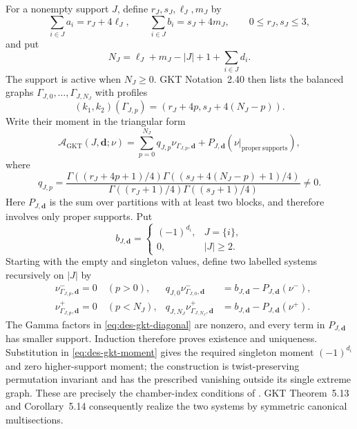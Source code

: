 For a nonempty support $J$, define $r_J,s_J,\ell_J,m_J$ by
\[
 \sum_{i\in J}a_i=r_J+4\ell_J,\qquad
 \sum_{i\in J}b_i=s_J+4m_J,\qquad 0\leq r_J,s_J\leq3,
\]
and put
\begin{equation}
 N_J=\ell_J+m_J-|J|+1+\sum_{i\in J}d_i.
 \label{eq:des-balanced-length}
\end{equation}
The support is active when $N_J\geq0$.  GKT Notation~2.40 then lists the
balanced graphs
$\Gamma_{J,0},\ldots,\Gamma_{J,N_J}$ with profiles
\begin{equation}
 (k_1,k_2)(\Gamma_{J,p})
 =(r_J+4p,s_J+4(N_J-p)).
 \label{eq:des-balanced-profiles}
\end{equation}
Write their moment in the triangular form
\begin{equation}
 \mathcal A_{\mathrm{GKT}}(J,\mathbf d;\nu)
 =\sum_{p=0}^{N_J}q_{J,p}\nu_{\Gamma_{J,p},\mathbf d}
  +P_{J,\mathbf d}(\nu|_{\mathrm{proper\ supports}}),
 \label{eq:des-gkt-moment}
\end{equation}
where
\begin{equation}
 q_{J,p}=
 \frac{\Gamma((r_J+4p+1)/4)\Gamma((s_J+4(N_J-p)+1)/4)}
 {\Gamma((r_J+1)/4)\Gamma((s_J+1)/4)}\ne0.
 \label{eq:des-gkt-diagonal}
\end{equation}
Here $P_{J,\mathbf d}$ is the sum over partitions with at least two blocks,
and therefore involves only proper supports.  Put
\[
 b_{J,\mathbf d}=
 \begin{cases}(-1)^{d_i},&J=\{i\},\\0,&|J|\geq2.\end{cases}
\]
Starting with the empty and singleton values, define two labelled systems
recursively on $|J|$ by
\begin{equation}
\begin{aligned}
 &\nu^-_{\Gamma_{J,p},\mathbf d}=0\quad(p>0),&
 q_{J,0}\nu^-_{\Gamma_{J,0},\mathbf d}
 &=b_{J,\mathbf d}-P_{J,\mathbf d}(\nu^-),\\
 &\nu^+_{\Gamma_{J,p},\mathbf d}=0\quad(p<N_J),&
 q_{J,N_J}\nu^+_{\Gamma_{J,N_J},\mathbf d}
 &=b_{J,\mathbf d}-P_{J,\mathbf d}(\nu^+).
\end{aligned}
 \label{eq:des-extreme-systems}
\end{equation}
The Gamma factors in \eqref{eq:des-gkt-diagonal} are nonzero, and every term
in $P_{J,\mathbf d}$ has smaller support.  Induction therefore proves
existence and uniqueness.  Substitution in \eqref{eq:des-gkt-moment} gives
the required singleton moment $(-1)^{d_i}$ and zero higher-support moment;
the construction is twist-preserving permutation invariant and has the
prescribed vanishing outside its single extreme graph.  These are precisely
the chamber-index conditions of \cite[Def.~3.47]{grossetal2022open}.
GKT Theorem~5.13 and Corollary~5.14 consequently realize the two systems by
symmetric canonical multisections.


